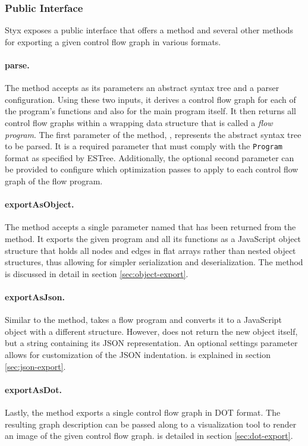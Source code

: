 \subsubsection{Public Interface}

Styx exposes a public interface that offers a  method and several other methods for exporting a given control flow graph in various formats.

\paragraph{parse.} The  method accepts as its parameters an abstract syntax tree and a parser configuration. Using these two inputs, it derives a control flow graph for each of the program's functions and also for the main program itself. It then returns all control flow graphs within a wrapping data structure that is called a \textit{flow program}. The first parameter of the  method, , represents the abstract syntax tree to be parsed. It is a required parameter that must comply with the \texttt{Program} format as specified by ESTree. Additionally, the optional second parameter  can be provided to configure which optimization passes to apply to each control flow graph of the flow program.

\paragraph{exportAsObject.} The  method accepts a single parameter named  that has been returned from the  method. It exports the given program and all its functions as a JavaScript object structure that holds all nodes and edges in flat arrays rather than nested object structures, thus allowing for simpler serialization and deserialization. The  method is discussed in detail in section \ref{sec:object-export}.

\paragraph{exportAsJson.} Similar to the  method,  takes a flow program and converts it to a JavaScript object with a different structure. However,  does not return the new object itself, but a string containing its JSON representation. An optional settings parameter allows for customization of the JSON indentation.  is explained in section \ref{sec:json-export}.

\paragraph{exportAsDot.} Lastly, the  method  exports a single control flow graph in DOT format. The resulting graph description can be passed along to a visualization tool to render an image of the given control flow graph.  is detailed in section \ref{sec:dot-export}.
